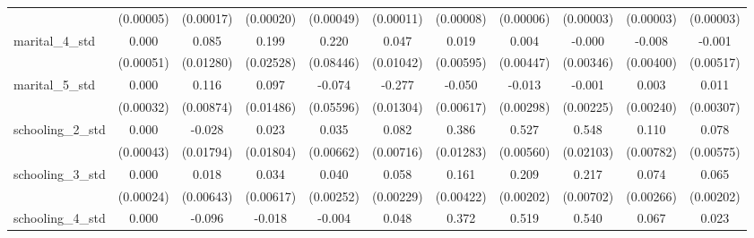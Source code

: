{\begin{tabular}{l*{10}{c}}
                    &   (0.00005)         &   (0.00017)         &   (0.00020)         &   (0.00049)         &   (0.00011)         &   (0.00008)         &   (0.00006)         &   (0.00003)         &   (0.00003)         &   (0.00003)         \\
marital\_4\_std       &       0.000         &       0.085\sym{***}&       0.199\sym{***}&       0.220\sym{**} &       0.047\sym{***}&       0.019\sym{**} &       0.004         &      -0.000         &      -0.008\sym{*}  &      -0.001         \\
                    &   (0.00051)         &   (0.01280)         &   (0.02528)         &   (0.08446)         &   (0.01042)         &   (0.00595)         &   (0.00447)         &   (0.00346)         &   (0.00400)         &   (0.00517)         \\
marital\_5\_std       &       0.000         &       0.116\sym{***}&       0.097\sym{***}&      -0.074         &      -0.277\sym{***}&      -0.050\sym{***}&      -0.013\sym{***}&      -0.001         &       0.003         &       0.011\sym{***}\\
                    &   (0.00032)         &   (0.00874)         &   (0.01486)         &   (0.05596)         &   (0.01304)         &   (0.00617)         &   (0.00298)         &   (0.00225)         &   (0.00240)         &   (0.00307)         \\
schooling\_2\_std     &       0.000         &      -0.028         &       0.023         &       0.035\sym{***}&       0.082\sym{***}&       0.386\sym{***}&       0.527\sym{***}&       0.548\sym{***}&       0.110\sym{***}&       0.078\sym{***}\\
                    &   (0.00043)         &   (0.01794)         &   (0.01804)         &   (0.00662)         &   (0.00716)         &   (0.01283)         &   (0.00560)         &   (0.02103)         &   (0.00782)         &   (0.00575)         \\
schooling\_3\_std     &       0.000         &       0.018\sym{**} &       0.034\sym{***}&       0.040\sym{***}&       0.058\sym{***}&       0.161\sym{***}&       0.209\sym{***}&       0.217\sym{***}&       0.074\sym{***}&       0.065\sym{***}\\
                    &   (0.00024)         &   (0.00643)         &   (0.00617)         &   (0.00252)         &   (0.00229)         &   (0.00422)         &   (0.00202)         &   (0.00702)         &   (0.00266)         &   (0.00202)         \\
schooling\_4\_std     &       0.000         &      -0.096\sym{***}&      -0.018         &      -0.004         &       0.048\sym{***}&       0.372\sym{***}&       0.519\sym{***}&       0.540\sym{***}&       0.067\sym{***}&       0.023\sym{***}\\

\end{tabular}}
